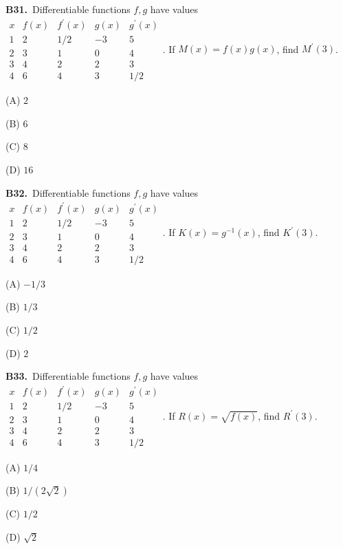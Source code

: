 \documentclass[11pt]{article}
\begin{document}
\bigskip\noindent\textbf{B31.}\ Differentiable functions $f,g$ have values $\begin{array}{c|rrrr}x&f(x)&f^{\prime}(x)&g(x)&g^{\prime}(x)\\1&2&1/2&-3&5\\2&3&1&0&4\\3&4&2&2&3\\4&6&4&3&1/2\end{array}$. If $M(x)=f(x)g(x)$, find $M^{\prime}(3)$.
\begin{list}{}{\setlength{\leftmargin}{3em}\setlength{\labelwidth}{2.5em}\setlength{\itemsep}{0pt}\setlength{\topsep}{2pt}}
\item[(A)] $2$
\item[(B)] $6$
\item[(C)] $8$
\item[(D)] $16$
\end{list}

\bigskip\noindent\textbf{B32.}\ Differentiable functions $f,g$ have values $\begin{array}{c|rrrr}x&f(x)&f^{\prime}(x)&g(x)&g^{\prime}(x)\\1&2&1/2&-3&5\\2&3&1&0&4\\3&4&2&2&3\\4&6&4&3&1/2\end{array}$. If $K(x)=g^{-1}(x)$, find $K^{\prime}(3)$.
\begin{list}{}{\setlength{\leftmargin}{3em}\setlength{\labelwidth}{2.5em}\setlength{\itemsep}{0pt}\setlength{\topsep}{2pt}}
\item[(A)] $-1/3$
\item[(B)] $1/3$
\item[(C)] $1/2$
\item[(D)] $2$
\end{list}

\bigskip\noindent\textbf{B33.}\ Differentiable functions $f,g$ have values $\begin{array}{c|rrrr}x&f(x)&f^{\prime}(x)&g(x)&g^{\prime}(x)\\1&2&1/2&-3&5\\2&3&1&0&4\\3&4&2&2&3\\4&6&4&3&1/2\end{array}$. If $R(x)=\sqrt{f(x)}$, find $R^{\prime}(3)$.
\begin{list}{}{\setlength{\leftmargin}{3em}\setlength{\labelwidth}{2.5em}\setlength{\itemsep}{0pt}\setlength{\topsep}{2pt}}
\item[(A)] $1/4$
\item[(B)] $1/(2\sqrt2)$
\item[(C)] $1/2$
\item[(D)] $\sqrt2$
\end{list}
\end{document}
